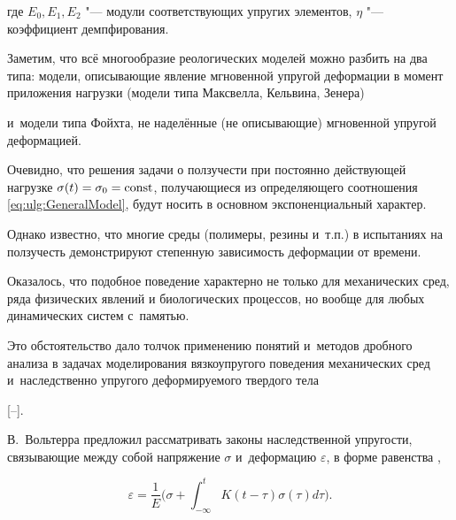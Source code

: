 где $E_{0}, E_{1}, E_{2}$ "---  модули соответствующих упругих элементов, $\eta$ "---  коэффициент демпфирования. 

Заметим, что всё многообразие реологических моделей можно разбить на два типа: модели, описывающие явление мгновенной упругой деформации в момент приложения нагрузки (модели типа Максвелла, Кельвина, Зенера) 

и~модели типа Фойхта, не наделённые (не описывающие) мгновенной упругой деформацией. 

Очевидно, что решения задачи о ползучести при постоянно действующей нагрузке $\sigma(t)=\sigma_{0}=\rm const$, получающиеся из определяющего соотношения \eqref{eq:ulg:GeneralModel}, будут носить в основном экспоненциальный характер. 

Однако известно, что многие среды (полимеры, резины и~т.п.) в испытаниях на ползучесть демонстрируют степенную зависимость деформации от времени. 

Оказалось, что подобное поведение характерно не только для механических сред, ряда физических явлений и биологических процессов, но  вообще для любых динамических систем с~памятью. 

Это обстоятельство дало толчок применению понятий и~методов дробного анализа в задачах моделирования вязкоупругого поведения механических сред и~наследственно упругого деформируемого твердого тела

[--]. 



В.~Вольтерра предложил рассматривать законы наследственной упругости, связывающие между собой напряжение $\sigma$ и~деформацию $\varepsilon$, в форме равенства \cite{ulg:bib:Volterra1909}, \cite[с.~223]{ulg:bib:Volterra1982}

\begin{equation}\label{eq:ulg:VolterraEpsilon}

\varepsilon=\frac{1}{E}\biggl(\sigma+\int ^{t}_{-\infty}K(t-\tau)\sigma(\tau)d\tau\biggr).

\end{equation}






